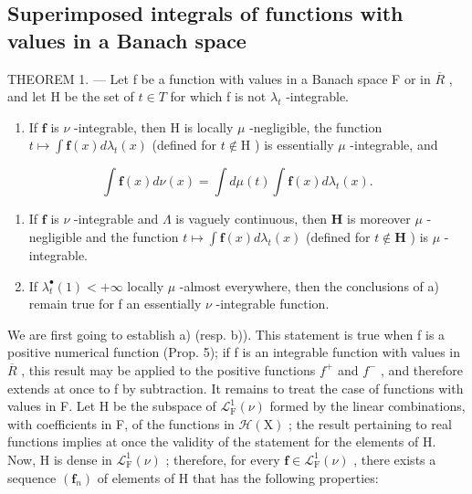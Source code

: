 \subsection{Superimposed integrals of functions with values in a Banach space}

THEOREM 1. --- Let f be a function with values in a Banach space F or in \(\overline{R}\) , and let H be the set of \(t \in T\) for which f is not \(\lambda_{t}\) -integrable.

\begin{enumerate}
\def\labelenumi{\alph{enumi})}
\tightlist
\item
  If \(\mathbf{f}\) is \(\nu\) -integrable, then \(\mathrm{H}\) is locally \(\mu\) -negligible, the function \(t \mapsto \int \mathbf{f}(x)d\lambda_t(x)\) (defined for \(t \notin \mathrm{H}\) ) is essentially \(\mu\) -integrable, and
\end{enumerate}

\[
\int \mathbf {f} (x) d \nu (x) = \int d \mu (t) \int \mathbf {f} (x) d \lambda_ {t} (x).\tag{11}
\]

\begin{enumerate}
\def\labelenumi{\alph{enumi})}
\setcounter{enumi}{1}
\item
  If \(\mathbf{f}\) is \(\nu\) -integrable and \(\Lambda\) is vaguely continuous, then \(\mathbf{H}\) is moreover \(\mu\) -negligible and the function \(t \mapsto \int \mathbf{f}(x) d\lambda_t(x)\) (defined for \(t \notin \mathbf{H}\) ) is \(\mu\) -integrable.
\item
  If \(\lambda_t^\bullet(1) < +\infty\) locally \(\mu\) -almost everywhere, then the conclusions of a) remain true for f an essentially \(\nu\) -integrable function.
\end{enumerate}

We are first going to establish a) (resp. b)). This statement is true when f is a positive numerical function (Prop. 5); if f is an integrable function with values in \(\overline{R}\) , this result may be applied to the positive functions \(f^{+}\) and \(f^{-}\) , and therefore extends at once to f by subtraction. It remains to treat the case of functions with values in F. Let H be the subspace of \(\mathcal{L}_{\mathrm{F}}^{1}(\nu)\) formed by the linear combinations, with coefficients in F, of the functions in \(\mathcal{H}(\mathrm{X})\) ; the result pertaining to real functions implies at once the validity of the statement for the elements of H. Now, H is dense in \(\mathcal{L}_{\mathrm{F}}^{1}(\nu)\) ; therefore, for every \(\mathbf{f} \in \mathcal{L}_{\mathrm{F}}^{1}(\nu)\) , there exists a sequence \((\mathbf{f}_{n})\) of elements of H that has the following properties:


